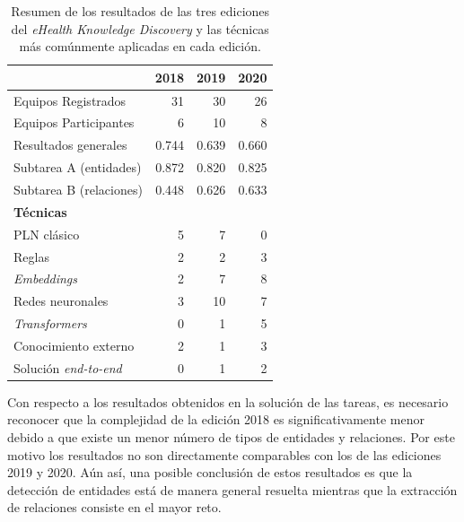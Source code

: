 \begin{table}[htb]\centering
    \begin{tabular}{lrrr}
        \toprule
        	                             &\bf 2018	&\bf 2019	&\bf 2020	\\
        \midrule
            Equipos Registrados          &	31  	&	30	    &	26  	\\
            Equipos Participantes        &	6	    &	10	    &	8	    \\
        \midrule
            Resultados generales         &	0.744	&	0.639	&	0.660	\\
            Subtarea A (entidades)       &	0.872	&	0.820   &	0.825	\\
            Subtarea B (relaciones)      &	0.448	&	0.626	&	0.633	\\
        \midrule
            \textbf{Técnicas}            &	    	&	    	&		    \\
            PLN clásico                  &	5	    &	7   	&	0	    \\
            Reglas	                     &	2	    &	2   	&	3	    \\
            \textit{Embeddings}          &	2	    &	7   	&	8   	\\
            Redes neuronales         	 &	3   	&	10  	&	7   	\\
            \textit{Transformers}        &	0   	&	1   	&	5   	\\
            Conocimiento externo    	 &	2   	&	1   	&	3   	\\
            Solución \textit{end-to-end} &	0   	&	1   	&	2   	\\
        \bottomrule
    \end{tabular}
    \caption[Resultados del \textit{eHealth Knowledge Discovery}]{Resumen de los resultados de las tres ediciones del \textit{eHealth Knowledge Discovery} y las técnicas más comúnmente aplicadas en cada edición.\label{tab:results-challenge}
}\end{table}

Con respecto a los resultados obtenidos en la solución de las tareas, es necesario reconocer que la complejidad de la edición 2018 es significativamente menor debido a que existe un menor número de tipos de entidades y relaciones. Por este motivo los resultados no son directamente comparables con los de las ediciones 2019 y 2020. Aún así, una posible conclusión de estos resultados es que la detección de entidades está de manera general resuelta mientras que la extracción de relaciones consiste en el mayor reto.


